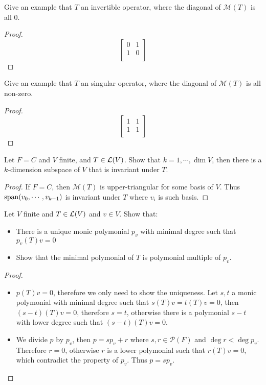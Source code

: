 \documentclass[../main.tex]{subfiles}
\begin{document}
\begin{exercise}
  Give an example that $T$ an invertible operator, where the diagonal of $\mathcal{M}(T)$ is all $0$.
\end{exercise}
\begin{proof}
  \[
  \begin{bmatrix}
    0 & 1 \\
    1 & 0 \\
  \end{bmatrix}
  \]
\end{proof}

\begin{exercise}
  Give an example that $T$ an singular operator, where the diagonal of $\mathcal{M}(T)$ is all non-zero.
\end{exercise}
\begin{proof}
  \[
  \begin{bmatrix}
    1 & 1 \\
    1 & 1 \\
  \end{bmatrix}
  \]
\end{proof}

\begin{exercise}
  Let $F = C$ and $V$ finite, and $T \in \mathcal{L}(V)$. Show that $k = 1, \cdots, \dim V$,
  then there is a $k$-dimension subspace of $V$ that is invariant under $T$.
\end{exercise}
\begin{proof}
  If $F = C$, then $\mathcal{M}(T)$ is upper-triangular for some basis of $V$.
  Thus $\operatorname{span}(v_0 , \cdots , v_{k - 1})$ is invariant under $T$ where $v_i$ is such basis.
\end{proof}

\begin{exercise}
  Let $V$ finite and $T \in \mathcal{L}(V)$ and $v \in V$. Show that:
  \begin{itemize}
    \item There is a unique monic polymonial $p_v$ with minimal degree such that $p_v(T)v = 0$
    \item Show that the minimal polymonial of $T$ is polymonial multiple of $p_v$.
  \end{itemize}
\end{exercise}
\begin{proof}
  ~
  \begin{itemize}
    \item $p(T)v = 0$, therefore we only need to show the uniqueness.
          Let $s, t$ a monic polymonial with minimal degree such that $s(T)v = t(T)v = 0$,
          then $(s - t)(T)v = 0$, therefore $s = t$, otherwise there is a polymonial $s - t$ with lower degree such that $(s - t)(T)v = 0$.
    \item We divide $p$ by $p_v$, then $p = s p_v + r$ where $s, r \in \mathcal{P}(F)$
          and $\deg r < \deg p_v$. Therefore $r = 0$, otherwise $r$ is a lower polymonial
          such that $r(T)v = 0$, which contradict the property of $p_v$.
          Thus $p = sp_v$.
  \end{itemize}
\end{proof}
\end{document}
